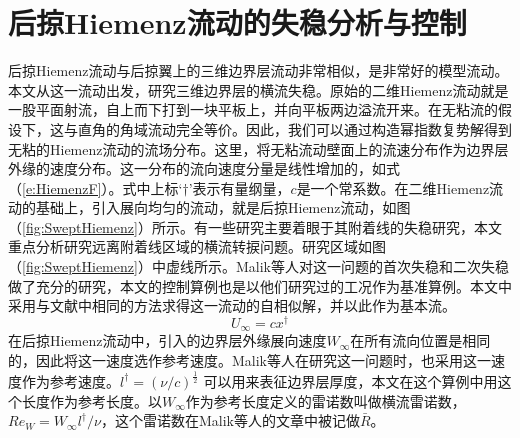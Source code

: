 \chapter{后掠Hiemenz流动的失稳分析与控制}
后掠Hiemenz流动与后掠翼上的三维边界层流动非常相似，是非常好的模型流动。本文从这一流动出发，研究三维边界层的横流失稳。原始的二维Hiemenz流动就是一股平面射流，自上而下打到一块平板上，并向平板两边溢流开来。在无粘流的假设下，这与直角的角域流动完全等价。因此，我们可以通过构造幂指数复势解得到无粘的Hiemenz流动的流场分布。这里，将无粘流动壁面上的流速分布作为边界层外缘的速度分布。这一分布的流向速度分量是线性增加的，如式（\ref{e:HiemenzF}）。式中上标`$\dagger$'表示有量纲量，$c$是一个常系数。在二维Hiemenz流动的基础上，引入展向均匀的流动，就是后掠Hiemenz流动，如图（\ref{fig:SweptHiemenz}）所示。有一些研究主要着眼于其附着线的失稳研究\cite{Lin1996,Guegan2006}，本文重点分析研究远离附着线区域的横流转捩问题。研究区域如图（\ref{fig:SweptHiemenz}）中虚线所示。Malik等人\cite{Malik1994}对这一问题的首次失稳和二次失稳做了充分的研究，本文的控制算例也是以他们研究过的工况作为基准算例。本文中采用与文献中\cite{Malik1994}相同的方法求得这一流动的自相似解，并以此作为基本流。
\begin{equation}\label{e:HiemenzF}
  U_{\infty}=cx^{\dagger}
\end{equation}
在后掠Hiemenz流动中，引入的边界层外缘展向速度$W_{\infty}$在所有流向位置是相同的，因此将这一速度选作参考速度。Malik等人在研究这一问题时，也采用这一速度作为参考速度。$l^\dagger=(\nu/c)^{\frac{1}{2}}$ 可以用来表征边界层厚度，本文在这个算例中用这个长度作为参考长度。以$W_{\infty}$作为参考长度定义的雷诺数叫做横流雷诺数，$Re_W=W_{\infty}l^\dagger/\nu$，这个雷诺数在Malik等人的文章\cite{Malik1994}中被记做$\bar{R}$。

